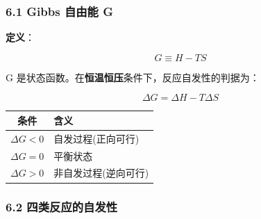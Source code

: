 \documentclass[a4paper,11pt]{ctexart}
\newcounter{none}
\newcommand{\箭}{\ensuremath{\rightarrow}}
\newcommand{\左箭}{\ensuremath{\leftarrow}}
\newcommand{\上箭}{\ensuremath{\uparrow}}
\newcommand{\下箭}{\ensuremath{\downarrow}}
\newcommand{\衡}{\ensuremath{\rightleftharpoons}}
\newcommand{\双箭}{\ensuremath{\leftrightarrow}}
\newcommand{\约等于}{\ensuremath{\approx}}
\newcommand{\小于等于}{\ensuremath{\leq}}
\newcommand{\大于等于}{\ensuremath{\geq}}
\newcommand{\不等于}{\ensuremath{\neq}}
\newcommand{\西格马}{\ensuremath{\sigma}}
\newcommand{\派}{\ensuremath{\pi}}
\begin{document}
\subsubsection{6.1 Gibbs 自由能 G}\label{gibbs-ux81eaux7531ux80fd-g}

\textbf{定义}：

\[
G \equiv H - TS
\]

G 是状态函数。在\textbf{恒温恒压}条件下，反应自发性的判据为：

\[
\boxed{\Delta G = \Delta H - T\Delta S}
\]

{\def\LTcaptype{none} %
\begin{longtable}[]{@{}cl@{}}
\toprule\noalign{}
条件 & 含义 \\
\midrule\noalign{}
\endhead
\bottomrule\noalign{}
\endlastfoot
\(\Delta G < 0\) & 自发过程(正向可行) \\
\(\Delta G = 0\) & 平衡状态 \\
\(\Delta G > 0\) & 非自发过程(逆向可行) \\
\end{longtable}
}

\subsubsection{6.2 四类反应的自发性}\label{ux56dbux7c7bux53cdux5e94ux7684ux81eaux53d1ux6027}
\end{document}
